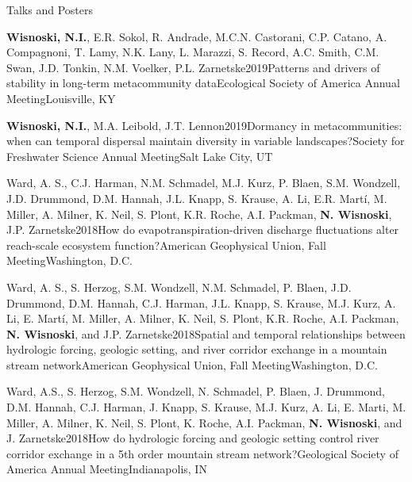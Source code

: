 \documentclass{resume} %
\begin{document}
\bigskip
\begin{rhangSection}{Talks and Posters}
  
    \begin{Presentation}{{\bf Wisnoski, N.I.}, E.R. Sokol, R. Andrade, M.C.N. Castorani, C.P. Catano, A. Compagnoni, T. Lamy, N.K. Lany, L. Marazzi, S. Record, A.C. Smith, C.M. Swan, J.D. Tonkin, N.M. Voelker, P.L. Zarnetske}{2019}{Patterns and drivers of stability in long-term metacommunity data}{Ecological Society of America Annual Meeting}{Louisville, KY}
  \end{Presentation}
  
   \begin{Presentation}{{\bf Wisnoski, N.I.}, M.A. Leibold, J.T. Lennon}{2019}{Dormancy in metacommunities: when can temporal dispersal maintain diversity in variable landscapes?}{Society for Freshwater Science Annual Meeting}{Salt Lake City, UT}
  \end{Presentation}
  
  \begin{Presentation}{Ward, A. S., C.J. Harman, N.M. Schmadel, M.J. Kurz, P. Blaen, S.M. Wondzell, J.D. Drummond, D.M. Hannah, J.L. Knapp, S. Krause, A. Li, E.R. Martí, M. Miller, A. Milner, K. Neil, S. Plont, K.R. Roche, A.I. Packman, {\bf N. Wisnoski}, J.P. Zarnetske}{2018}{How do evapotranspiration-driven discharge fluctuations alter reach-scale ecosystem function?}{American Geophysical Union, Fall Meeting}{Washington, D.C.}
  \end{Presentation}
  
   \begin{Presentation}{Ward, A. S., S. Herzog, S.M. Wondzell, N.M. Schmadel, P. Blaen, J.D. Drummond, D.M. Hannah, C.J. Harman, J.L. Knapp, S. Krause, M.J. Kurz, A. Li, E. Martí, M. Miller, A. Milner, K. Neil, S. Plont, K.R. Roche, A.I. Packman, {\bf N. Wisnoski}, and J.P. Zarnetske}{2018}{Spatial and temporal relationships between hydrologic forcing, geologic setting, and river corridor exchange in a mountain stream network}{American Geophysical Union, Fall Meeting}{Washington, D.C.}
  \end{Presentation}
  
  \begin{Presentation}{Ward, A.S., S. Herzog, S.M. Wondzell, N. Schmadel, P. Blaen, J. Drummond, D.M. Hannah, C.J. Harman, J. Knapp, S. Krause, M.J. Kurz, A. Li, E. Marti, M. Miller, A. Milner, K. Neil, S. Plont, K. Roche, A.I. Packman, {\bf N. Wisnoski}, and J. Zarnetske}{2018}{How do hydrologic forcing and geologic setting control river corridor exchange in a 5th order mountain stream network?}{Geological Society of America Annual Meeting}{Indianapolis, IN}
  \end{Presentation}
  

\end{rhangSection}
\end{document}
